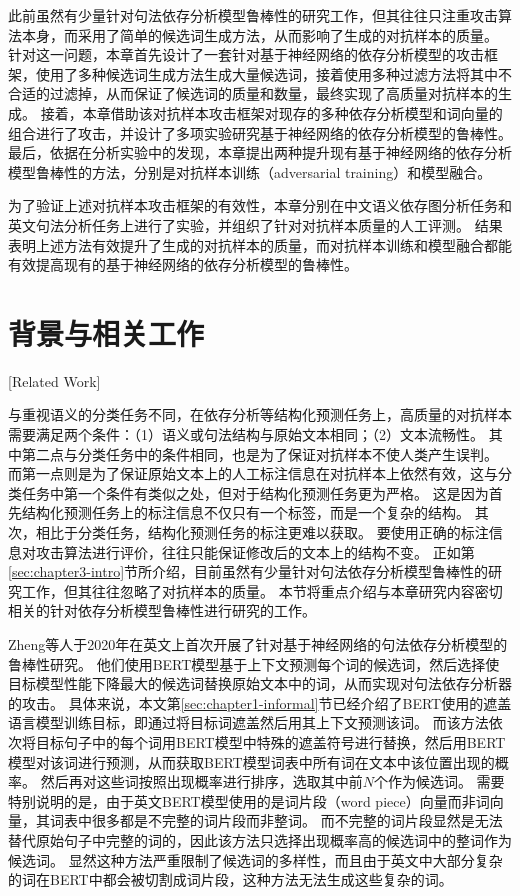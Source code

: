 此前虽然有少量针对句法依存分析模型鲁棒性的研究工作，但其往往只注重攻击算法本身，而采用了简单的候选词生成方法，从而影响了生成的对抗样本的质量。
针对这一问题，本章首先设计了一套针对基于神经网络的依存分析模型的攻击框架，使用了多种候选词生成方法生成大量候选词，接着使用多种过滤方法将其中不合适的过滤掉，从而保证了候选词的质量和数量，最终实现了高质量对抗样本的生成。
接着，本章借助该对抗样本攻击框架对现存的多种依存分析模型和词向量的组合进行了攻击，并设计了多项实验研究基于神经网络的依存分析模型的鲁棒性。
最后，依据在分析实验中的发现，本章提出两种提升现有基于神经网络的依存分析模型鲁棒性的方法，分别是对抗样本训练（adversarial training）和模型融合。

为了验证上述对抗样本攻击框架的有效性，本章分别在中文语义依存图分析任务和英文句法分析任务上进行了实验，并组织了针对对抗样本质量的人工评测。
结果表明上述方法有效提升了生成的对抗样本的质量，而对抗样本训练和模型融合都能有效提高现有的基于神经网络的依存分析模型的鲁棒性。

\section{背景与相关工作}[Related Work]

与重视语义的分类任务不同，在依存分析等结构化预测任务上，高质量的对抗样本需要满足两个条件：（1）语义或句法结构与原始文本相同；（2）文本流畅性。
其中第二点与分类任务中的条件相同，也是为了保证对抗样本不使人类产生误判。
而第一点则是为了保证原始文本上的人工标注信息在对抗样本上依然有效，这与分类任务中第一个条件有类似之处，但对于结构化预测任务更为严格。
这是因为首先结构化预测任务上的标注信息不仅只有一个标签，而是一个复杂的结构。
其次，相比于分类任务，结构化预测任务的标注更难以获取。
要使用正确的标注信息对攻击算法进行评价，往往只能保证修改后的文本上的结构不变。
正如第\ref{sec:chapter3-intro}节所介绍，目前虽然有少量针对句法依存分析模型鲁棒性的研究工作，但其往往忽略了对抗样本的质量。
本节将重点介绍与本章研究内容密切相关的针对依存分析模型鲁棒性进行研究的工作。

Zheng等人\cite{zheng-etal-2020-evaluating}于2020年在英文上首次开展了针对基于神经网络的句法依存分析模型的鲁棒性研究。
他们使用BERT模型基于上下文预测每个词的候选词，然后选择使目标模型性能下降最大的候选词替换原始文本中的词，从而实现对句法依存分析器的攻击。
具体来说，本文第\ref{sec:chapter1-informal}节已经介绍了BERT使用的遮盖语言模型训练目标，即通过将目标词遮盖然后用其上下文预测该词。
而该方法依次将目标句子中的每个词用BERT模型中特殊的遮盖符号进行替换，然后用BERT模型对该词进行预测，从而获取BERT模型词表中所有词在文本中该位置出现的概率。
然后再对这些词按照出现概率进行排序，选取其中前$N$个作为候选词。
需要特别说明的是，由于英文BERT模型使用的是词片段（word piece）向量而非词向量，其词表中很多都是不完整的词片段而非整词。
而不完整的词片段显然是无法替代原始句子中完整的词的，因此该方法只选择出现概率高的候选词中的整词作为候选词。
显然这种方法严重限制了候选词的多样性，而且由于英文中大部分复杂的词在BERT中都会被切割成词片段，这种方法无法生成这些复杂的词。


